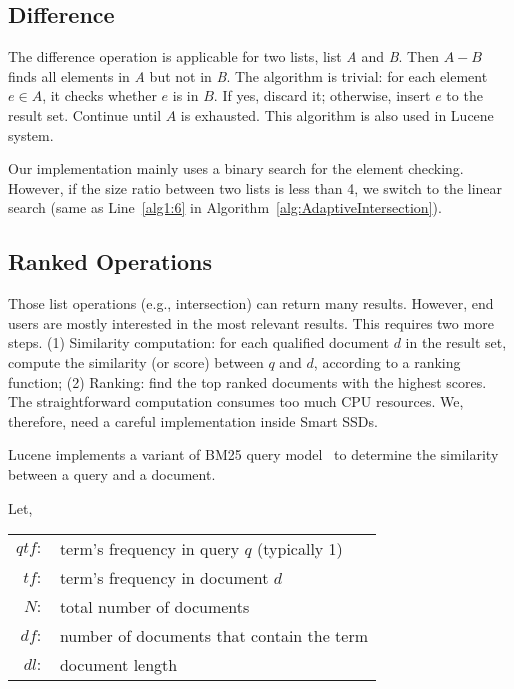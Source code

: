 \subsection{Difference}\label{sec:difference}
The difference operation is applicable for two lists, list \emph{A} and \emph{B}. Then $A-B$ finds all elements in \emph{A} but not in \emph{B}. The algorithm is trivial: for each element $e\in A$, it checks whether $e$ is in $B$. If yes, discard it; otherwise, insert $e$ to the result set. Continue until $A$ is exhausted. This algorithm is also used in Lucene system.

Our implementation mainly uses a binary search for the element checking. However, if the size ratio between two lists is less than 4, we switch to the linear search (same as Line~\ref{alg1:6} in Algorithm~\ref{alg:AdaptiveIntersection}).



\subsection{Ranked Operations}\label{sec:ranked}

Those list operations (e.g., intersection) can return many results. However, end users are mostly interested in the most relevant results. This requires two more steps. (1) Similarity computation: for each qualified document $d$ in the result set, compute the similarity (or score) between $q$ and $d$, according to a ranking function; (2) Ranking: find the top ranked documents with the highest scores. The straightforward computation consumes too much CPU resources. We, therefore, need a careful implementation inside Smart SSDs.

Lucene implements a variant of BM25 query model~\cite{Robertson1994,Singhal01} to determine the similarity between a query and a document.

\noindent Let,

\begin{tabular}{rl}
$qtf:$& term's frequency in query $q$ (typically 1)\\
$tf:$ & term's frequency in document $d$\\
$N:$ & total number of documents\\
$df:$ & number of documents that contain the term\\
$dl:$ & document length\\
\end{tabular}

